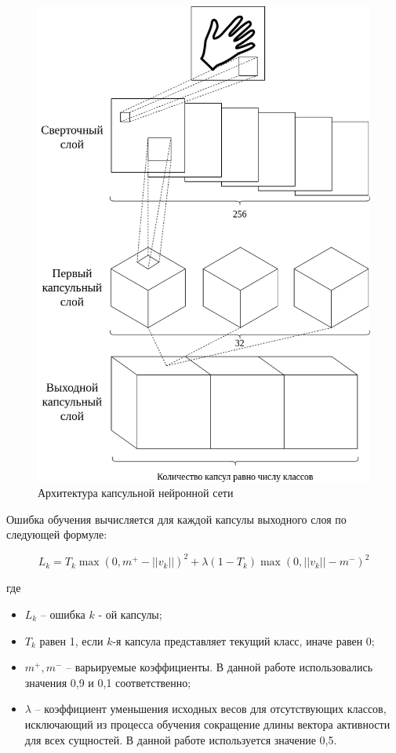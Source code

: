 \begin{figure}
	\centering
	\includegraphics[width=\textwidth]{inc/img/CapsNet}
	\caption{Архитектура капсульной нейронной сети}
	\label{design:CapsNet}
\end{figure}

Ошибка обучения вычисляется для каждой капсулы выходного слоя по следующей формуле:

\begin{equation}
\label{eq:magin-loss}
L_k = T_k \max (0, m^+ - ||v_k||)^2 + \lambda (1 - T_k) \max (0, ||v_k|| - m^-)^2
\end{equation}

где

\begin{itemize}
	\item $L_k$ -- ошибка $k$ - ой капсулы;
	\item $T_k$ равен 1, если $k$-я капсула представляет текущий класс, иначе равен 0;
	\item $m^+, m^-$ -- варьируемые коэффициенты. В данной работе использовались значения 0,9 и 0,1 соответственно;
	\item $\lambda$ -- коэффициент уменьшения исходных весов для отсутствующих классов, исключающий из процесса обучения сокращение длины вектора активности для всех сущностей. В данной работе используется значение 0,5.
\end{itemize}

